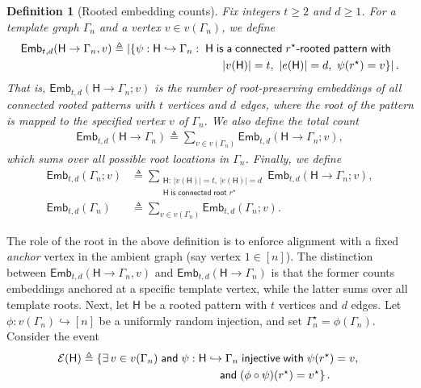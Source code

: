 \documentclass[12pt]{article}
\newtheorem{definition}{Definition}
\newcommand{\calE}{{\cal E}}
\newcommand{\s}[1]{\mathsf{#1}}
\begin{document}
\begin{definition}[Rooted embedding counts]
Fix integers $t\ge 2$ and $d\ge 1$. For a template graph $\Gamma_n$ and a vertex $v\in v(\Gamma_n)$,
we define
\begin{align}
\s{Emb}_{t,d}(\s{H}\to\Gamma_n,v)&\triangleq\left|\left\{\psi:\s{H}\hookrightarrow \Gamma_n:\; \s{H}\; \s{is}\; \s{a}\; \s{connected}\; r^\star\text{-}\s{rooted}\; \s{pattern}\; \s{with}\; \right.\right.\nonumber\\
&\left.\left.\hspace{3.3cm}|v(\s{H})|=t,\ |e(\s{H})|=d,\ \psi(r^\star)=v\right\}\right|.
\end{align}
That is, $\s{Emb}_{t,d}(\s{H}\to\Gamma_n;v)$ is the number of root-preserving embeddings of all
connected rooted patterns with $t$ vertices and $d$ edges, where the root of the pattern is mapped to
the specified vertex $v$ of $\Gamma_n$. We also define the total count
\begin{align}
\s{Emb}_{t,d}(\s{H}\to\Gamma_n)
\triangleq \sum_{v\in v(\Gamma_n)}\s{Emb}_{t,d}(\s{H}\to\Gamma_n;v),
\end{align}
which sums over all possible root locations in $\Gamma_n$. Finally, we define
\begin{align}
\s{Emb}_{t,d}(\Gamma_n;v)&\triangleq\sum_{\substack{\s{H}:\,|v(\s{H})|=t,\,|e(\s{H})|=d\\\s{H}\;\s{is}\;\s{connected}\;\s{root}\;r^\star}}
\s{Emb}_{t,d}(\s{H}\to\Gamma_n;v),\\
\s{Emb}_{t,d}(\Gamma_n)&\triangleq\sum_{v\in v(\Gamma_n)} \s{Emb}_{t,d}(\Gamma_n;v).\label{eqn:defEmbDTotalG}
\end{align}
\end{definition}
The role of the root in the above definition is to enforce alignment with a fixed \emph{anchor} vertex in the ambient graph (say vertex $1\in[n]$). The distinction between $\s{Emb}_{t,d}(\s{H}\to\Gamma_n,v)$ and $\s{Emb}_{t,d}(\s{H}\to\Gamma_n)$ is that the former counts embeddings anchored at a specific template vertex, while the latter sums over all template roots. Next, let $\s{H}$ be a rooted pattern with $t$ vertices and $d$ edges. Let $\phi:v(\Gamma_n)\hookrightarrow [n]$ be a uniformly random injection, and set $\Gamma_n^\star=\phi(\Gamma_n)$. Consider the event
\begin{align}
\calE(\s{H})&\triangleq\left\{\exists\, v\in v(\Gamma_n)\; \s{and}\; \psi:\s{H}\hookrightarrow \Gamma_n\; \s{injective}\;\s{with}\;\psi(r^\star)=v,\right.\nonumber\\
&\left.\hspace{4.2cm} \s{and}\; (\phi\circ\psi)(r^\star)=v^\star\right\}.\label{eqn:calEHalpha}
\end{align}
\end{document}
